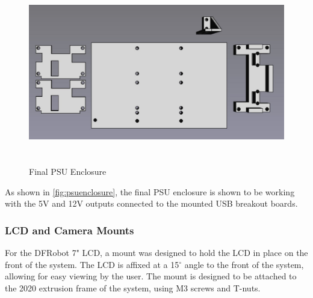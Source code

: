 \begin{figure}[H]
    \begin{minipage}[h]{0.95\textwidth}
        \centering
        \includegraphics[height=8cm]{imgs/freecad/psu_mount.jpg}
        \caption{Final PSU Enclosure}
        \label{fig:psuenclosure}
    \end{minipage}
\end{figure}

As shown in \autoref{fig:psuenclosure}, the final PSU enclosure is shown to be working with the 5V and 12V outputs connected to the mounted USB breakout boards.

\subsubsection{LCD and Camera Mounts}
\label{sec:lcd-mount}
For the DFRobot 7" LCD, a mount was designed to hold the LCD in place on the front of the system. The LCD is affixed at a 15$^{\circ}$ angle to the front of the system, allowing for easy viewing by the user. The mount is designed to be attached to the 2020 extrusion frame of the system, using M3 screws and T-nuts.

